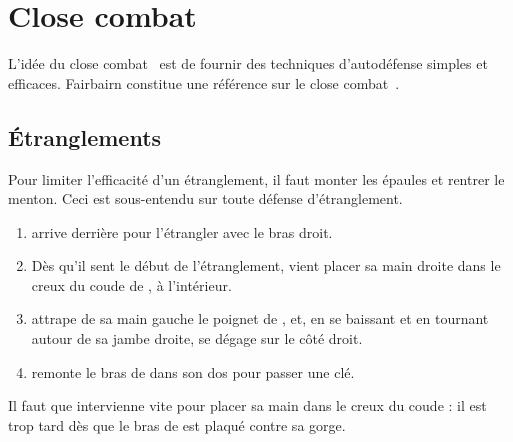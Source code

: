 \chapter{Close combat}


L'idée du close combat~\footnotemark{} est de fournir des techniques d'autodéfense simples et efficaces.%
Fairbairn constitue une référence sur le close combat~\cite{fairbairn:allin:2008}.




\section{Étranglements}


Pour limiter l'efficacité d'un étranglement, il faut monter les épaules et rentrer le menton.
Ceci est sous-entendu sur toute défense d'étranglement.


\begin{technique}

\begin{enumerate}
	\item \A arrive derrière \D pour l'étrangler avec le bras droit.
	
	\item Dès qu'il sent le début de l'étranglement, \D vient placer sa main droite dans le creux du coude de \A, à l'intérieur.
	
	\item \D attrape de sa main gauche le poignet de \A, et, en se baissant et en tournant autour de sa jambe droite, se dégage sur le côté droit.
	
	\item \D remonte le bras de \A dans son dos pour passer une clé.
\end{enumerate}

Il faut que \D intervienne vite pour placer sa main dans le creux du coude : il est trop tard dès que le bras de \A est plaqué contre sa gorge.

\end{technique}


